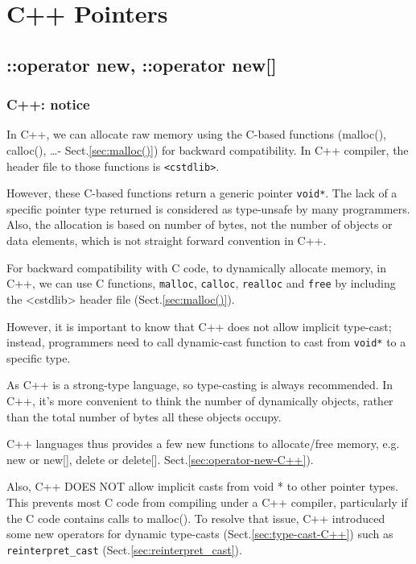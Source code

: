 \chapter{C++ Pointers}

\section{::operator new, ::operator new[]}

\subsection{C++: notice}

In C++, we can allocate raw memory using the C-based functions (malloc(),
calloc(), \ldots - Sect.\ref{sec:malloc()}) for backward compatibility.
In C++ compiler, the header file to those functions is \verb!<cstdlib>!.


However, these C-based functions return a generic pointer \verb!void*!. The lack
of a specific pointer type returned is considered as type-unsafe by many
programmers. Also, the allocation is based on number of bytes, not the number of
objects or data elements, which is not straight forward convention in C++.  

\begin{mdframed}

For backward compatibility with C code, to dynamically allocate memory, in C++,
we can use C functions,  \verb!malloc!, \verb!calloc!, \verb!realloc! and
\verb!free! by including the <cstdlib> header file (Sect.\ref{sec:malloc()}).

However, it is important to know that C++ does not allow implicit type-cast;
instead, programmers need to call dynamic-cast function to cast from
\verb!void*! to a specific type.

\end{mdframed}


As C++ is a strong-type language, so type-casting is always recommended.
In C++, it's more convenient to think the number of dynamically objects, rather
than the total number of bytes all these objects occupy.

C++ languages thus provides a few new functions to allocate/free memory, e.g.
new or new[], delete or delete[]. Sect.\ref{sec:operator-new-C++}).

Also, C++ DOES NOT allow implicit casts from void * to other pointer types.
This prevents most C code from compiling under a C++ compiler, particularly if
the C code contains calls to malloc(). To resolve that issue, C++ introduced some
new operators for dynamic type-casts (Sect.\ref{sec:type-cast-C++}) such as 
\verb!reinterpret_cast! (Sect.\ref{sec:reinterpret_cast}).

